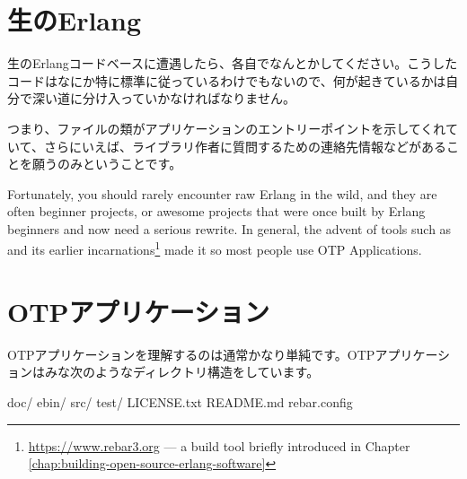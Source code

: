\section{生のErlang}
\label{sec:dive-raw-erlang}

生のErlangコードベースに遭遇したら、各自でなんとかしてください。こうしたコードはなにか特に標準に従っているわけでもないので、何が起きているかは自分で深い道に分け入っていかなければなりません。

つまり、ファイルの類がアプリケーションのエントリーポイントを示してくれていて、さらにいえば、ライブラリ作者に質問するための連絡先情報などがあることを願うのみということです。

Fortunately, you should rarely encounter raw Erlang in the wild, and they are often beginner projects, or awesome projects that were once built by Erlang beginners and now need a serious rewrite. In general, the advent of tools such as  and its earlier incarnations\footnote{\href{https://www.rebar3.org}{https://www.rebar3.org} — a build tool briefly introduced in Chapter \ref{chap:building-open-source-erlang-software}} made it so most people use OTP Applications.

\section{OTPアプリケーション}
\label{sec:dive-otp-applications}

OTPアプリケーションを理解するのは通常かなり単純です。OTPアプリケーションはみな次のようなディレクトリ構造をしています。

\begin{VerbatimRaw}
doc/
ebin/
src/
test/
LICENSE.txt
README.md
rebar.config
\end{VerbatimRaw}

